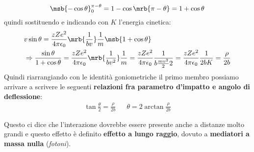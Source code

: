 \begin{itemize}
\begin{equation}
		      \msb{-\cos{\theta}}_0^{\pi-\theta} = 1-\cos{\mrb{\pi-\theta}} = 1
		      + \cos{\theta}
	      \end{equation}
	      quindi sostituendo e indicando con $K$ l'energia cinetica:
	      \begin{align}
          &v\sin{\theta}
          = \frac{zZe^2}{4\pi\epsilon_0}\mrb{\frac{1}{bv}}\frac{1}{m}
            \msb{1 + \cos{\theta}}
		      \\\notag
		      &\Rightarrow \frac{\sin{\theta}}{1+\cos{\theta}}
          = \frac{zZe^2}{4\pi\epsilon_0}\mrb{\frac{1}{bv^2}}\frac{1}{m}
		      = \frac{zZe^2}{4\pi\epsilon_0}\frac{1}{b\frac{mv^2}{2}2}
		      = \frac{zZe^2}{4\pi\epsilon_0}\frac{1}{2bK}
          = \frac{\rho}{2b}
	      \end{align}
	      Quindi riarrangiando con le identità goniometriche il primo membro possiamo
	      arrivare a scrivere le seguenti \textbf{relazioni fra parametro d'impatto e
		      angolo di deflessione}:
	      \begin{align}
		      \boxed{\tan{\frac{\theta}{2}} = \frac{\rho}{2b}} &  & \boxed{\theta =
			      2\arctan{\frac{\rho}{2b}}}
		      \label{eq:impact_parameter_angle}
	      \end{align}

	      \begin{note}[]
		      Questo ci dice che l'interazione dovrebbe essere presente anche a
		      distanze molto grandi e questo effetto è definito \textbf{effetto a lungo
			      raggio}, dovuto a \textbf{mediatori a massa nulla} (\textit{fotoni}).
	      \end{note}
\end{itemize}

